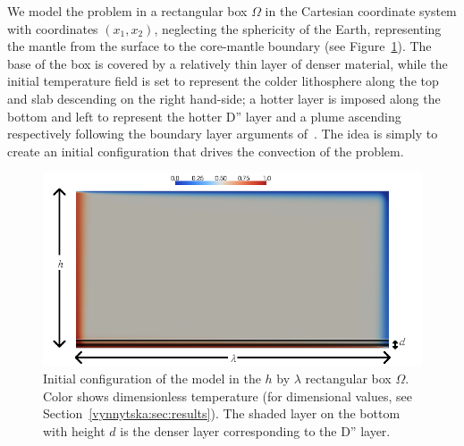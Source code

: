 We model the problem in a rectangular box $\Omega$ in the Cartesian
coordinate system with coordinates $(x_1, x_2)$, neglecting the
sphericity of the Earth, representing the mantle from the surface to
the core-mantle boundary (see Figure~\ref{vynnytska:fig:IC}). The base
of the box is covered by a relatively thin layer of denser material,
while the initial temperature field is set to represent the colder
lithosphere along the top and slab descending on the right hand-side;
a hotter layer is imposed along the bottom and left to represent the
hotter D'' layer and a plume ascending respectively following the
boundary layer arguments of~\citet{KekenEtAl1997}. The idea is simply
to create an initial configuration that drives the convection of the
problem.
\begin{figure}
  \begin{center}
   \includegraphics[width=0.95\columnwidth]{chapters/vynnytska/png/layout.png}
    \caption{Initial configuration of the model in the $h$ by
      $\lambda$ rectangular box $\Omega$. Color shows dimensionless
      temperature (for dimensional values, see
      Section~\ref{vynnytska:sec:results}). The shaded layer on the
      bottom with height $d$ is the denser layer corresponding to the
      D'' layer.}
  \end{center}
  \label{vynnytska:fig:IC}
\end{figure}

